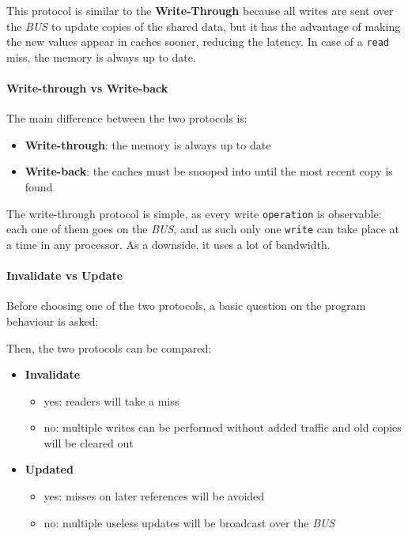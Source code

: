 \documentclass[english]{article}
\begin{document}
This protocol is similar to the \textbf{Write-Through} because all writes are sent over the \textit{BUS} to update copies of the shared data, but it has the advantage of making the new values appear in caches sooner, reducing the latency.
In case of a \texttt{read} miss, the memory is always up to date.

\paragraph{Write-through vs Write-back}

The main difference between the two protocols is:

\begin{itemize}
  \item \textbf{Write-through}: the memory is always up to date
  \item \textbf{Write-back}: the caches must be snooped into until the most recent copy is found
\end{itemize}

The write-through protocol is simple, as every write \texttt{operation} is observable:
each one of them goes on the \textit{BUS}, and as such only one \texttt{write} can take place at a time in any processor.
As a downside, it uses a lot of bandwidth.

\paragraph{Invalidate vs Update}

Before choosing one of the two protocols, a basic question on the program behaviour is asked:


Then, the two protocols can be compared:

\begin{itemize}
  \item \textbf{Invalidate}
        \begin{itemize}
          \item[\cmark] yes: readers will take a miss
          \item[\xmark] no: multiple writes can be performed without added traffic and old copies will be cleared out
        \end{itemize}
  \item \textbf{Updated}
        \begin{itemize}
          \item[\cmark] yes: misses on later references will be avoided
          \item[\xmark] no: multiple useless updates will be broadcast over the \textit{BUS}
        \end{itemize}
\end{itemize}
\end{document}
